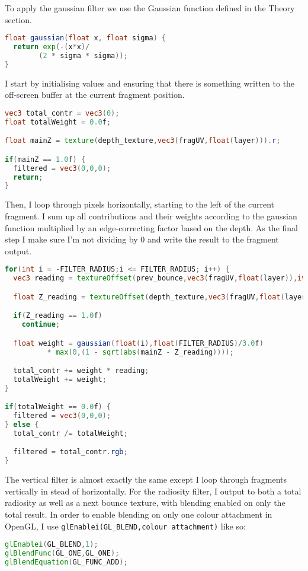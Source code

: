 To apply the gaussian filter we use the Gaussian function defined in the Theory section.
\begin{lstlisting}[language=GLSL]
float gaussian(float x, float sigma) {
  return exp(-(x*x)/
        (2 * sigma * sigma));
}
\end{lstlisting}

I start by initialising values and ensuring that there is something written to the off-screen buffer at the current fragment position.
\begin{lstlisting}[caption={bilat\_hor.frag},language=GLSL]
vec3 total_contr = vec3(0);
float totalWeight = 0.0f;

float mainZ = texture(depth_texture,vec3(fragUV,float(layer))).r;

if(mainZ == 1.0f) {
  filtered = vec3(0,0,0);
  return;
}
\end{lstlisting}

Then, I loop through pixels horizontally, starting to the left of the current fragment. I sum up all contributions and their weights according to the gaussian function multiplied by an edge-correcting factor based on the depth. As the final step I make sure I'm not dividing by 0 and write the result to the fragment output.
\begin{lstlisting}[caption={bilat\_hor.frag},language=GLSL]
for(int i = -FILTER_RADIUS;i <= FILTER_RADIUS; i++) {
  vec3 reading = textureOffset(prev_bounce,vec3(fragUV,float(layer)),ivec2(i,0)).rgb;

  float Z_reading = textureOffset(depth_texture,vec3(fragUV,float(layer)),ivec2(i,0)).r;

  if(Z_reading == 1.0f)
    continue;

  float weight = gaussian(float(i),float(FILTER_RADIUS)/3.0f)
          * max(0,(1 - sqrt(abs(mainZ - Z_reading))));

  total_contr += weight * reading;
  totalWeight += weight;
}

if(totalWeight == 0.0f) {
  filtered = vec3(0,0,0);
} else {
  total_contr /= totalWeight;

  filtered = total_contr.rgb;
}
\end{lstlisting}

The vertical filter is almost exactly the same except I loop through fragments vertically in stead of horizontally. For the radiosity filter, I output to both a total radiosity as well as a next bounce texture, with blending enabled on only the total result. In order to enable blending on only one colour attachment in OpenGL, I use \verb=glEnablei(GL_BLEND,colour attachment)= like so:
\begin{lstlisting}[caption={Filters.cpp},language=GLSL]
glEnablei(GL_BLEND,1);
glBlendFunc(GL_ONE,GL_ONE);
glBlendEquation(GL_FUNC_ADD);
\end{lstlisting}


